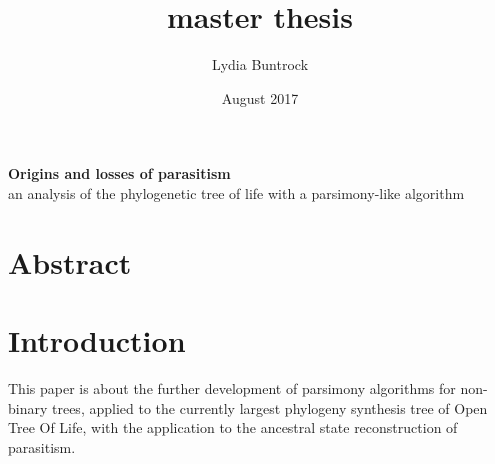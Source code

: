 
\author{Lydia Buntrock}
\title{master thesis}
\date{August 2017}


  \begin{titlepage}
    \pagestyle{empty}
  	
    	\vspace{20mm}
    	\begin{Large}
    	    \textbf{Origins and losses of parasitism}\\
          an analysis of the phylogenetic tree of life with a parsimony-like algorithm\\
    	\end{Large}

  	\clearpage
  \end{titlepage}

\chapter*{Abstract}

\tableofcontents
\clearpage

\chapter{Introduction}
  This paper is about the further development of parsimony algorithms for non-binary trees, applied 
  to the currently largest phylogeny synthesis tree of Open Tree Of Life, with the application to 
  the ancestral state reconstruction of parasitism. \\

